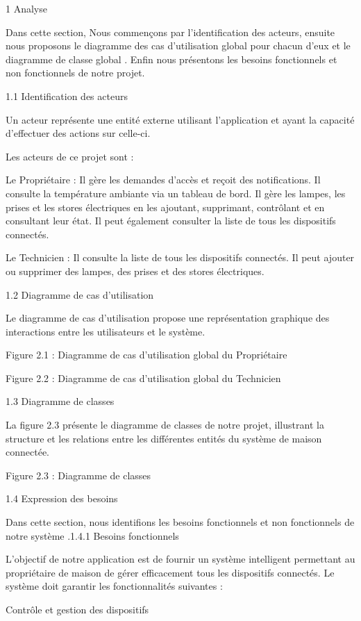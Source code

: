 \documentclass{article}
\begin{document}
1 Analyse 

Dans cette section, Nous commençons par l’identification des acteurs, ensuite nous proposons le diagramme des cas d’utilisation global pour chacun d’eux et le diagramme de classe global . Enfin nous présentons les besoins fonctionnels et non fonctionnels de notre projet.

1.1 Identification des acteurs

Un acteur représente une entité externe utilisant l'application et ayant la capacité d'effectuer des actions sur celle-ci. 

Les acteurs de ce projet sont :

Le Propriétaire : Il gère les demandes d’accès et reçoit des notifications. Il consulte la température ambiante via un tableau de bord. Il gère les lampes, les prises et les stores électriques en les ajoutant, supprimant, contrôlant et en consultant leur état. Il peut également consulter la liste de tous les dispositifs connectés.

Le Technicien : Il consulte la liste  de tous les dispositifs connectés. Il peut ajouter ou supprimer des lampes, des prises et des stores électriques. 

1.2 Diagramme de cas d’utilisation

Le diagramme de cas d'utilisation propose une représentation graphique des interactions entre les utilisateurs et le système. 

Figure 2.1 : Diagramme de cas d’utilisation global du Propriétaire

Figure 2.2 : Diagramme de cas d’utilisation global du Technicien

1.3 Diagramme de classes

La figure 2.3 présente le diagramme de classes de notre projet, illustrant la structure et les relations entre les différentes entités du système de maison connectée.

Figure 2.3 : Diagramme de classes

1.4 Expression des besoins

Dans cette section, nous identifions les besoins fonctionnels et non fonctionnels de notre système .1.4.1 Besoins fonctionnels

L’objectif de notre application est de fournir un système intelligent permettant au propriétaire de maison de gérer efficacement tous les dispositifs connectés. Le système doit garantir les fonctionnalités suivantes :

Contrôle et gestion des dispositifs
\end{document}
